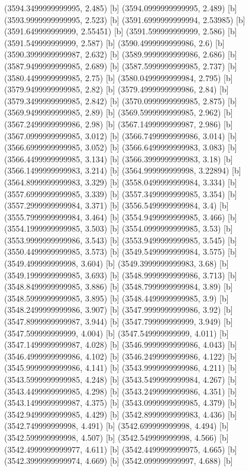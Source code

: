 {{{(3594.3499999999995, 2.485) [b] 
(3594.0999999999995, 2.489) [b] 
(3593.9999999999995, 2.523) [b] 
(3591.6999999999994, 2.53985) [b] 
(3591.649999999999, 2.55451) [b] 
(3591.599999999999, 2.586) [b] 
(3591.549999999999, 2.587) [b] 
(3590.4999999999986, 2.6) [b] 
(3590.3999999999987, 2.632) [b] 
(3589.9999999999986, 2.686) [b] 
(3587.9499999999985, 2.689) [b] 
(3587.5999999999985, 2.737) [b] 
(3580.4499999999985, 2.75) [b] 
(3580.0499999999984, 2.795) [b] 
(3579.9499999999985, 2.82) [b] 
(3579.4999999999986, 2.84) [b] 
(3579.3499999999985, 2.842) [b] 
(3570.0999999999985, 2.875) [b] 
(3569.9499999999985, 2.89) [b] 
(3569.5999999999985, 2.962) [b] 
(3567.2499999999986, 2.98) [b] 
(3567.1499999999987, 2.986) [b] 
(3567.0999999999985, 3.012) [b] 
(3566.7499999999986, 3.014) [b] 
(3566.6999999999985, 3.052) [b] 
(3566.6499999999983, 3.083) [b] 
(3566.4499999999985, 3.134) [b] 
(3566.3999999999983, 3.18) [b] 
(3566.1499999999983, 3.214) [b] 
(3564.999999999998, 3.22894) [b] 
(3564.8999999999983, 3.329) [b] 
(3558.0499999999984, 3.334) [b] 
(3557.6999999999985, 3.339) [b] 
(3557.3499999999985, 3.354) [b] 
(3557.2999999999984, 3.371) [b] 
(3556.5499999999984, 3.4) [b] 
(3555.7999999999984, 3.464) [b] 
(3554.9499999999985, 3.466) [b] 
(3554.1999999999985, 3.503) [b] 
(3554.0999999999985, 3.53) [b] 
(3553.9999999999986, 3.543) [b] 
(3553.9499999999985, 3.545) [b] 
(3550.4499999999985, 3.573) [b] 
(3549.5499999999984, 3.575) [b] 
(3549.499999999998, 3.604) [b] 
(3549.3999999999983, 3.68) [b] 
(3549.1999999999985, 3.693) [b] 
(3548.9999999999986, 3.713) [b] 
(3548.8499999999985, 3.886) [b] 
(3548.7999999999984, 3.89) [b] 
(3548.5999999999985, 3.895) [b] 
(3548.4499999999985, 3.9) [b] 
(3548.2499999999986, 3.907) [b] 
(3547.9999999999986, 3.92) [b] 
(3547.8999999999987, 3.944) [b] 
(3547.799999999999, 3.949) [b] 
(3547.599999999999, 4.004) [b] 
(3547.549999999999, 4.011) [b] 
(3547.1499999999987, 4.028) [b] 
(3546.9999999999986, 4.043) [b] 
(3546.4999999999986, 4.102) [b] 
(3546.2499999999986, 4.122) [b] 
(3545.9999999999986, 4.141) [b] 
(3543.9999999999986, 4.211) [b] 
(3543.5999999999985, 4.248) [b] 
(3543.5499999999984, 4.267) [b] 
(3543.4499999999985, 4.298) [b] 
(3543.2499999999986, 4.351) [b] 
(3543.1499999999987, 4.375) [b] 
(3543.0999999999985, 4.379) [b] 
(3542.9499999999985, 4.429) [b] 
(3542.8999999999983, 4.436) [b] 
(3542.749999999998, 4.491) [b] 
(3542.699999999998, 4.494) [b] 
(3542.599999999998, 4.507) [b] 
(3542.549999999998, 4.566) [b] 
(3542.4999999999977, 4.611) [b] 
(3542.4499999999975, 4.665) [b] 
(3542.3999999999974, 4.669) [b] 
(3542.099999999997, 4.688) [b] 
}}}
